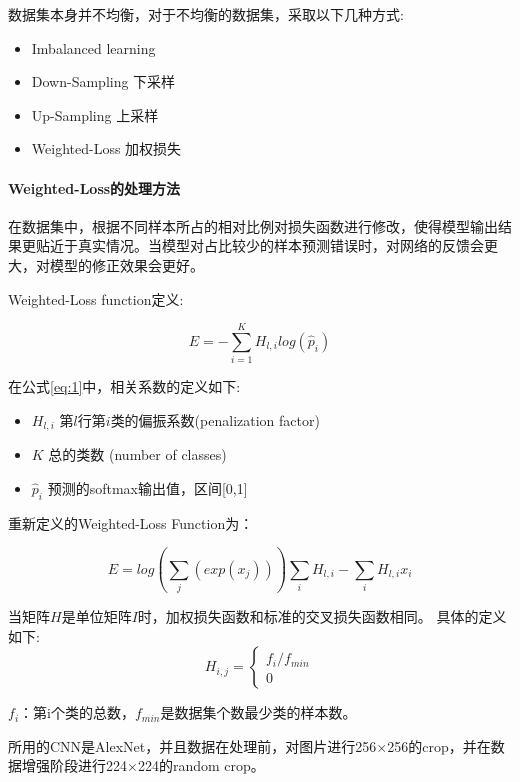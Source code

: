 \documentclass[11pt, a4paper]{article}
\begin{document}
\begin{CJK}{UTF8}{gbsn}
数据集本身并不均衡，对于不均衡的数据集，采取以下几种方式:

\begin{itemize}
\item Imbalanced learning
\item Down-Sampling 下采样
\item Up-Sampling 上采样
\item Weighted-Loss 加权损失
\end{itemize}

\paragraph{Weighted-Loss的处理方法}
在数据集中，根据不同样本所占的相对比例对损失函数进行修改，使得模型输出结果更贴近于真实情况。当模型对占比较少的样本预测错误时，对网络的反馈会更大，对模型的修正效果会更好。

Weighted-Loss function定义:

\begin{equation}
\label{eq:1}
E = - \sum_{i=1}^{K} H_{l,i}log(\hat{p}_{i})
\end{equation}

在公式\ref{eq:1}中，相关系数的定义如下:
\begin{itemize}
\item $H_{l,i}$ 第$l$行第$i$类的偏振系数(penalization factor)
\item $K$ 总的类数 (number of classes)
\item $\hat{p}_{i}$ 预测的softmax输出值，区间[0,1]
\end{itemize}

重新定义的Weighted-Loss Function为：

\begin{equation}
E = log(\sum_{j}(exp(x_j)))\sum_{i}H_{l,i} - \sum_{i}H_{l,i}x_{i}
\end{equation}

当矩阵$H$是单位矩阵$I$时，加权损失函数和标准的交叉损失函数相同。
具体的定义如下:
\begin{equation}
H_{i,j} = \left\{\begin{matrix}
f_i/f_{min} \\ 0 \end{matrix}\right.
\end{equation}

$f_i$：第i个类的总数，$f_{min}$是数据集个数最少类的样本数。


所用的CNN是AlexNet，并且数据在处理前，对图片进行256$\times$256的crop，并在数据增强阶段进行224$\times$224的random crop。


\end{CJK}
\end{document}
